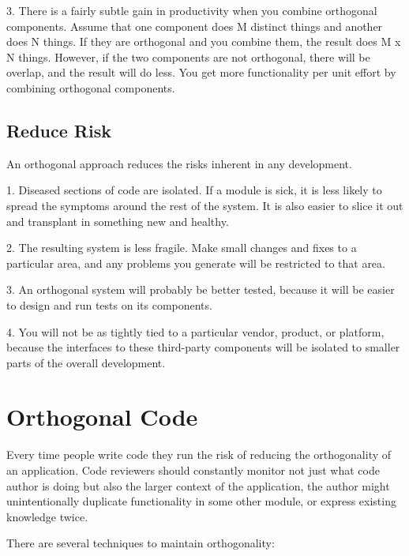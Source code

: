 3. There is a fairly subtle gain in productivity when you combine orthogonal components. Assume that one component does M distinct things and another does N things. If they are orthogonal and you combine them, the result does M x N things. However, if the two components are not orthogonal, there will be overlap, and the result will do less. You get more functionality per unit effort by combining orthogonal components.

\subsection{Reduce Risk}

An orthogonal approach reduces the risks inherent in any development.

1. Diseased sections of code are isolated. If a module is sick, it is less likely to spread the symptoms around the rest of the system. It is also easier to slice it out and transplant in something new and healthy.

2. The resulting system is less fragile. Make small changes and fixes to a particular area, and any problems you generate will be restricted to that area.

3. An orthogonal system will probably be better tested, because it will be easier to design and run tests on its components.

4. You will not be as tightly tied to a particular vendor, product, or platform, because the interfaces to these third-party components will be isolated to smaller parts of the overall development.

\section{Orthogonal Code}

Every time people write code they run the risk of reducing the orthogonality of an application. Code reviewers should constantly monitor not just what code author is doing but also the larger context of the application, the author might unintentionally duplicate functionality in some other module, or express existing knowledge twice.

There are several techniques to maintain orthogonality:

